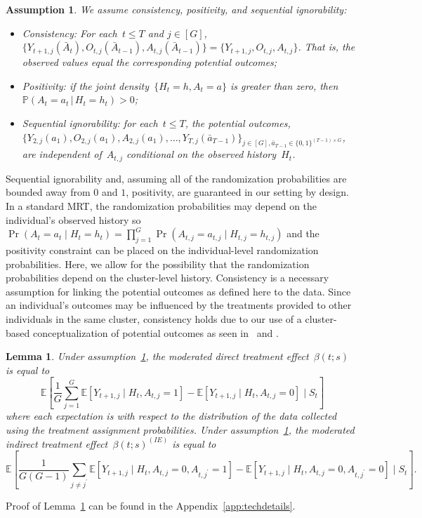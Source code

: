 \documentclass[12pt]{article}
\def\given{\, | \,}
\newtheorem{lemma}[thm]{Lemma}
\newtheorem{assumption}[thm]{Assumption}
\begin{document}
\begin{assumption} \normalfont
  \label{consistency}
  We assume consistency, positivity, and sequential ignorability:
  \begin{itemize}
  \item Consistency: For each~$t \leq T$ and $j \in [G]$,
    $\{Y_{t+1,j} (\bar{A}_{t} ), O_{t,j} (\bar A_{t-1}), A_{t,j} (\bar{A}_{t-1} )\}  = \{Y_{t+1, j}, O_{t,j}, A_{t,j}\}$.
    That is, the observed values equal the corresponding potential outcomes;
  \item Positivity: if the joint density~$\{ H_t = h, A_t = a\}$ is greater
    than zero, then~$\mathbb{P} (A_t = a_t \given H_t = h_t ) > 0$;
  \item Sequential ignorability: for each~$t \leq T$, the
    potential outcomes,\\ $\{Y_{2,j} ( a_{1}), O_{2,j}(a_{1}),A_{2,j}( a_{1}), \ldots,
    Y_{T,j} (\bar a_{T-1}) \}_{j \in [G], \bar a_{T-1}\in \{0,1\}^{(T-1)\times G}}$, are independent of~$A_{t,j}$ conditional on the observed history~$H_t$.
  \end{itemize}
\end{assumption}

Sequential ignorability and, assuming all of the randomization probabilities are bounded away from $0$ and $1$, positivity, are guaranteed in our setting  by design. In a standard MRT, the randomization probabilities may depend on the individual's observed history so $\Pr(A_t = a_t \mid H_t = h_t) = \prod_{j=1}^G \Pr(A_{t,j} = a_{t,j} \mid H_{t,j} = h_{t,j})$ and the positivity constraint can be placed on the individual-level randomization probabilities.  Here, we allow for the possibility that the randomization probabilities depend on the cluster-level history. Consistency is a necessary assumption for linking the potential outcomes as defined here to the data. Since an individual's outcomes may be influenced by the treatments provided to other individuals in the same cluster, consistency holds due to our use of a cluster-based conceptualization of potential outcomes as seen in~\cite{Hong2006} and \cite{Vanderweele2013}.

\begin{lemma}
  \label{lemma:cond_effect}
  Under assumption~\ref{consistency}, the moderated direct treatment effect~$\beta(t;s)$ is equal to
  $$
  \mathbb{E} \left[ \frac{1}{G} \sum_{j=1}^G \mathbb{E} \left[ Y_{t+1,j} \mid H_{t}, A_{t,j} = 1 \right] - \mathbb{E} \left[ Y_{t+1,j} \mid H_{t}, A_{t,j} = 0 \right] \mid S_t \right]
  $$
  where each expectation is with respect to the distribution of the
  data collected using the treatment assignment probabilities. Under assumption~\ref{consistency}, the moderated indirect treatment effect~$\beta(t;s)^{(IE)}$ is equal to
  $$
  \mathbb{E} \left[ \frac{1}{G (G-1)} \sum_{j \neq j^\prime} \mathbb{E} \left[ Y_{t+1,j} \mid H_{t}, A_{t,j} = 0, A_{t,j^\prime} = 1 \right] - \mathbb{E} \left[ Y_{t+1,j} \mid H_{t}, A_{t,j} = 0, A_{t,j^\prime} = 0 \right] \mid S_t \right].
  $$
\end{lemma}
\noindent Proof of Lemma~\ref{lemma:cond_effect} can be found in the Appendix~\ref{app:techdetails}.
\end{document}
